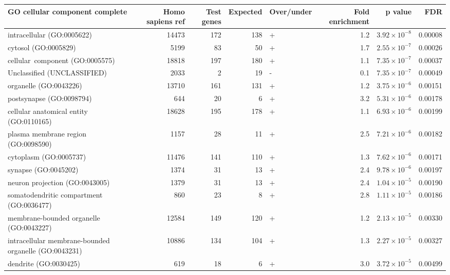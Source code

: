 \begin{table}[ht]
\end{table}

\begin{table}[ht]
\centering
\begin{adjustbox}{width=\textwidth}
\begin{tabular}{lrrrlrrr}
  \hline
GO cellular component complete & Homo sapiens ref & Test genes & Expected & Over/under & Fold enrichment & p value & FDR \\ 
  \hline
intracellular (GO:0005622) & 14473 & 172 & 138 & + & 1.2 & $3.92 \times 10^{-8}$ & 0.00008 \\ 
  cytosol (GO:0005829) & 5199 & 83 & 50 & + & 1.7 & $2.55 \times 10^{-7}$ & 0.00026 \\ 
  cellular\  component (GO:0005575) & 18818 & 197 & 180 & + & 1.1 & $7.35 \times 10^{-7}$ & 0.00037 \\ 
  Unclassified (UNCLASSIFIED) & 2033 & 2 & 19 & - & 0.1 & $7.35 \times 10^{-7}$ & 0.00049 \\ 
  organelle (GO:0043226) & 13710 & 161 & 131 & + & 1.2 & $3.75 \times 10^{-6}$ & 0.00151 \\ 
  postsynapse (GO:0098794) & 644 & 20 & 6 & + & 3.2 & $5.31 \times 10^{-6}$ & 0.00178 \\ 
  cellular anatomical entity (GO:0110165) & 18628 & 195 & 178 & + & 1.1 & $6.93 \times 10^{-6}$ & 0.00199 \\ 
  plasma membrane region (GO:0098590) & 1157 & 28 & 11 & + & 2.5 & $7.21 \times 10^{-6}$ & 0.00182 \\ 
  cytoplasm (GO:0005737) & 11476 & 141 & 110 & + & 1.3 & $7.62 \times 10^{-6}$ & 0.00171 \\ 
  synapse (GO:0045202) & 1374 & 31 & 13 & + & 2.4 & $9.78 \times 10^{-6}$ & 0.00197 \\ 
  neuron projection (GO:0043005) & 1379 & 31 & 13 & + & 2.4 & $1.04 \times 10^{-5}$ & 0.00190 \\ 
  somatodendritic compartment (GO:0036477) & 860 & 23 & 8 & + & 2.8 & $1.11 \times 10^{-5}$ & 0.00186 \\ 
  membrane-bounded organelle (GO:0043227) & 12584 & 149 & 120 & + & 1.2 & $2.13 \times 10^{-5}$ & 0.00330 \\ 
  intracellular membrane-bounded organelle (GO:0043231) & 10886 & 134 & 104 & + & 1.3 & $2.27 \times 10^{-5}$ & 0.00327 \\ 
  dendrite (GO:0030425) & 619 & 18 & 6 & + & 3.0 & $3.72 \times 10^{-5}$ & 0.00499 \\ 

\end{tabular}
\end{adjustbox}
\end{table}
